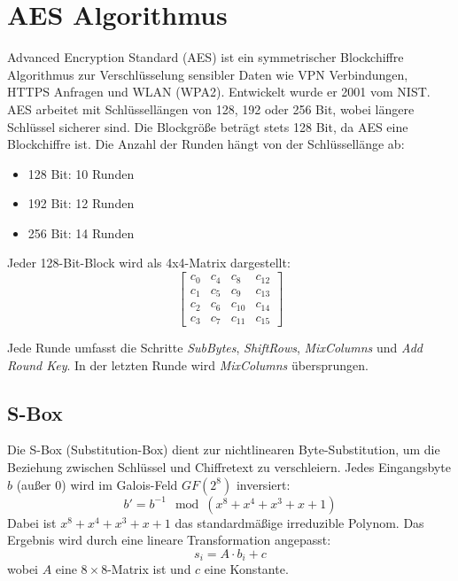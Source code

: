 \section{AES Algorithmus}
\setlength{\parindent}{0pt}

Advanced Encryption Standard (AES) ist ein symmetrischer Blockchiffre Algorithmus zur Verschlüsselung sensibler Daten wie VPN Verbindungen, HTTPS Anfragen und WLAN (WPA2). Entwickelt wurde er 2001 vom NIST. AES arbeitet mit Schlüssellängen von 128, 192 oder 256 Bit, wobei längere Schlüssel sicherer sind. Die Blockgröße beträgt stets 128 Bit, da AES eine Blockchiffre ist. Die Anzahl der Runden hängt von der Schlüssellänge ab: 
\begin{itemize}
    \item 128 Bit: 10 Runden
    \item 192 Bit: 12 Runden
    \item 256 Bit: 14 Runden
\end{itemize}

Jeder 128-Bit-Block wird als 4x4-Matrix dargestellt:
\[
\begin{bmatrix}
c_0  & c_4  & c_8  & c_{12} \\
c_1  & c_5  & c_9  & c_{13} \\
c_2  & c_6  & c_{10} & c_{14} \\
c_3  & c_7  & c_{11} & c_{15}
\end{bmatrix}
\]

Jede Runde umfasst die Schritte \textit{SubBytes}, \textit{ShiftRows}, \textit{MixColumns} und \textit{Add Round Key}. In der letzten Runde wird \textit{MixColumns} übersprungen.\cite{AES_Algorithmus_2}\cite{AES_Algorithmus_3}\cite{AES_Algorithmus}\cite{Blockchiffre}

\subsection{S-Box}
Die S-Box (Substitution-Box) dient zur nichtlinearen Byte-Substitution, um die Beziehung zwischen Schlüssel und Chiffretext zu verschleiern. Jedes Eingangsbyte \(b\) (außer 0) wird im Galois-Feld \(GF(2^8)\) inversiert:
\[
b' = b^{-1} \mod (x^8 + x^4 + x^3 + x + 1)
\]
Dabei ist \(x^8 + x^4 + x^3 + x + 1\) das standardmäßige irreduzible Polynom. Das Ergebnis wird durch eine lineare Transformation angepasst:
\[
s_i = A \cdot b_i + c
\]
wobei \(A\) eine $8 \times 8$-Matrix ist und \(c\) eine Konstante.\cite{Endliche_körper}\cite{S_Box}

